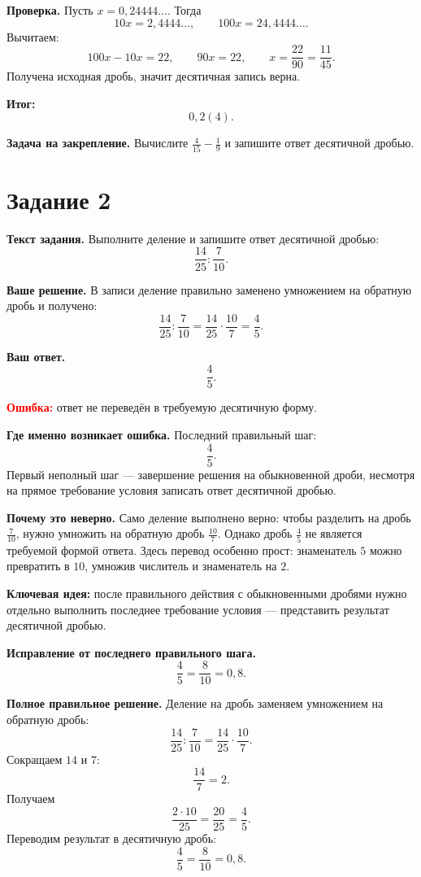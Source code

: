 \documentclass[12pt,a4paper]{article}
\begin{document}
\textbf{Проверка.}
Пусть $x=0{,}24444\ldots$. Тогда
\[
10x=2{,}4444\ldots,\qquad 100x=24{,}4444\ldots.
\]
Вычитаем:
\[
100x-10x=22,
\qquad
90x=22,
\qquad
x=\frac{22}{90}=\frac{11}{45}.
\]
Получена исходная дробь, значит десятичная запись верна.

\textcolor{teal!60!black}{\textbf{Итог:}}
\[
\boxed{0{,}2(4)}.
\]

\textbf{Задача на закрепление.}
Вычислите $\frac{4}{15}-\frac{1}{9}$ и запишите ответ десятичной дробью.

\newpage
{}\label{task:2}
\section*{Задание 2}

\textbf{Текст задания.}
Выполните деление и запишите ответ десятичной дробью:
\[
\frac{14}{25}:\frac{7}{10}.
\]

\textbf{Ваше решение.}
В записи деление правильно заменено умножением на обратную дробь и получено:
\[
\frac{14}{25}:\frac{7}{10}
=\frac{14}{25}\cdot\frac{10}{7}
=\frac45.
\]

\textbf{Ваш ответ.}
\[
\frac45.
\]

\textcolor{red}{\textbf{Ошибка:}} ответ не переведён в требуемую десятичную форму.

\textbf{Где именно возникает ошибка.}
Последний правильный шаг:
\[
\frac45.
\]
Первый неполный шаг --- завершение решения на обыкновенной дроби, несмотря на прямое требование условия записать ответ десятичной дробью.

\textbf{Почему это неверно.}
Само деление выполнено верно: чтобы разделить на дробь $\frac{7}{10}$, нужно умножить на обратную дробь $\frac{10}{7}$. Однако дробь $\frac45$ не является требуемой формой ответа. Здесь перевод особенно прост: знаменатель $5$ можно превратить в $10$, умножив числитель и знаменатель на $2$.

\textcolor{blue!60!black}{\textbf{Ключевая идея:}} после правильного действия с обыкновенными дробями нужно отдельно выполнить последнее требование условия --- представить результат десятичной дробью.

\textbf{Исправление от последнего правильного шага.}
\[
\frac45=\frac{8}{10}=0{,}8.
\]

\textbf{Полное правильное решение.}
Деление на дробь заменяем умножением на обратную дробь:
\[
\frac{14}{25}:\frac{7}{10}
=\frac{14}{25}\cdot\frac{10}{7}.
\]
Сокращаем $14$ и $7$:
\[
\frac{14}{7}=2.
\]
Получаем
\[
\frac{2\cdot 10}{25}=\frac{20}{25}=\frac45.
\]
Переводим результат в десятичную дробь:
\[
\frac45=\frac8{10}=0{,}8.
\]
\end{document}
